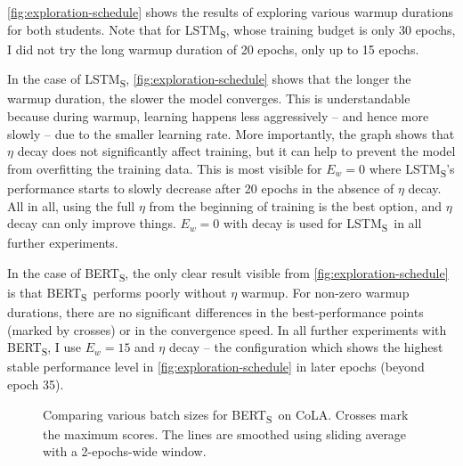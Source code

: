 \documentclass[bsc,frontabs,twoside,singlespacing,parskip,deptreport]{infthesis}
\def\BERTS{BERT\textsubscript{S}}
\def\LSTMS{LSTM\textsubscript{S}}
\def\sliding{The lines are smoothed using sliding average with a 2-epochs-wide window.}
\begin{document}
{{{      \autoref{fig:exploration-schedule} shows the results of exploring various warmup durations for both students. Note that for \LSTMS, whose training budget is only 30 epochs, I did not try the long warmup duration of 20 epochs, only up to 15 epochs.

      In the case of \LSTMS, \autoref{fig:exploration-schedule} shows that the longer the warmup duration, the slower the model converges. This is understandable because during warmup, learning happens less aggressively -- and hence more slowly -- due to the smaller learning rate. More importantly, the graph shows that $\eta$ decay does not significantly affect training, but it can help to prevent the model from overfitting the training data. This is most visible for $E_w=0$ where \LSTMS's performance starts to slowly decrease after 20 epochs in the absence of $\eta$ decay. All in all, using the full $\eta$ from the beginning of training is the best option, and $\eta$ decay can only improve things. $E_w=0$ with decay is used for \LSTMS~in all further experiments.

      In the case of \BERTS, the only clear result visible from \autoref{fig:exploration-schedule} is that \BERTS~performs poorly without $\eta$ warmup. For non-zero warmup durations, there are no significant differences in the best-performance points (marked by crosses) or in the convergence speed. In all further experiments with \BERTS, I use $E_w=15$ and $\eta$ decay -- the configuration which shows the highest stable performance level in \autoref{fig:exploration-schedule} in later epochs (beyond epoch 35).

      \begin{figure}[h!t]
        \centering
        \caption{Comparing various batch sizes for \BERTS~on CoLA. Crosses mark the maximum scores. \sliding}
        \label{fig:exploration-B-bert}
      \end{figure}

}}}
\end{document}
